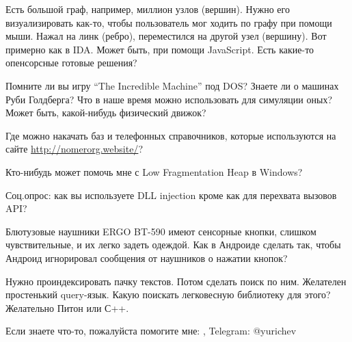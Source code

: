 Есть большой граф, например, миллион узлов (вершин).
Нужно его визуализировать как-то, чтобы пользователь мог ходить по графу при помощи мыши.
Нажал на линк (ребро), переместился на другой узел (вершину).
Вот примерно как в IDA.
Может быть, при помощи JavaScript.
Есть какие-то опенсорсные готовые решения?

\myhrule{}

Помните ли вы игру ``The Incredible Machine'' под DOS?
Знаете ли о машинах Руби Голдберга?
Что в наше время можно использовать для симуляции оных?
Может быть, какой-нибудь физический движок?

\myhrule{}

Где можно накачать баз и телефонных справочников, которые используются на сайте \url{http://nomerorg.website/}?

\myhrule{}

Кто-нибудь может помочь мне с Low Fragmentation Heap в Windows?

\myhrule{}

Соц.опрос: как вы используете DLL injection кроме как для перехвата вызовов API?

\myhrule{}

Блютузовые наушники ERGO BT-590 имеют сенсорные кнопки, слишком чувствительные, и их легко задеть одеждой.
Как в Андроиде сделать так, чтобы Андроид игнорировал сообщения от наушников о нажатии кнопок?

\myhrule{}

Нужно проиндексировать пачку текстов. Потом сделать поиск по ним. Желателен простенький query-язык.
Какую поискать легковесную библиотеку для этого?
Желательно Питон или С++.

\myhrule{}

Если знаете что-то, пожалуйста помогите мне: \EMAIL{}, Telegram: @yurichev
